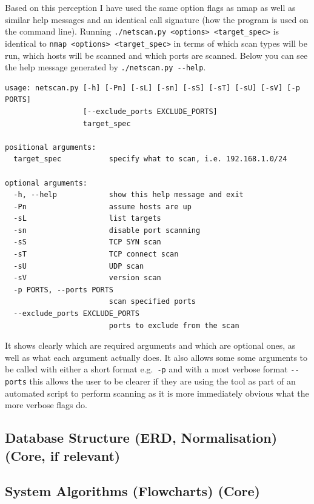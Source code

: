 \documentclass[titlepage]{article}
\let\Oldsubsection\subsection{}
\renewcommand{\subsection}{\FloatBarrier\Oldsubsection}
\begin{document}
Based on this perception I have used the same option flags as nmap as well as similar help messages
and an identical call signature (how the program is used on the command line). Running 
\verb|./netscan.py <options> <target_spec>| is identical to \verb|nmap <options> <target_spec>| in terms
of which scan types will be run, which hosts will be scanned and which \glspl{port} are scanned. Below you can see
the help message generated by \verb|./netscan.py --help|.
\begin{verbatim}
usage: netscan.py [-h] [-Pn] [-sL] [-sn] [-sS] [-sT] [-sU] [-sV] [-p PORTS]
                  [--exclude_ports EXCLUDE_PORTS]
                  target_spec

positional arguments:
  target_spec           specify what to scan, i.e. 192.168.1.0/24

optional arguments:
  -h, --help            show this help message and exit
  -Pn                   assume hosts are up
  -sL                   list targets
  -sn                   disable port scanning
  -sS                   TCP SYN scan
  -sT                   TCP connect scan
  -sU                   UDP scan
  -sV                   version scan
  -p PORTS, --ports PORTS
                        scan specified ports
  --exclude_ports EXCLUDE_PORTS
                        ports to exclude from the scan
\end{verbatim}

It shows clearly which are required arguments and which are optional ones, as well as what
each argument actually does. It also allows some some arguments to be called with either
a short format e.g.\ \verb|-p| and with a most verbose format \verb|--ports| this allows
the user to be clearer if they are using the tool as part of an automated script to perform
scanning as it is more immediately obvious what the more verbose flags do.

\subsection{Database Structure (ERD, Normalisation) (Core, if relevant)}

\textbf{\color{red}{I am fairly sure this is irrelevant to mine?}}

\subsection{System Algorithms (Flowcharts) (Core)}

\textbf{\color{Emerald}{When I have finished the first draft of the text bits I will add pictures / flowcharts}}
\end{document}
